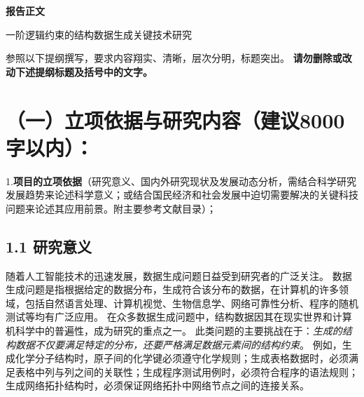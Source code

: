 \documentclass[12pt,UTF8,AutoFakeBold=3,a4paper]{ctexart} %
\begin{document}
\begin{center}
{\sanhao \kaishu \bfseries 报告正文 
\par 一阶逻辑约束的结构数据生成关键技术研究}
\end{center}

{\sihao \kaishu 参照以下提纲撰写，要求内容翔实、清晰，层次分明，标题突出。{\color{MsBlue} \bfseries 请勿删除或改动下述提纲标题及括号中的文字。}}
\vskip -5mm
{\color{MsBlue} \section{（一）立项依据与研究内容（建议8000字以内）：}}

{\sihao \kaishu \color{MsBlue} 1.{\bfseries 项目的立项依据}（研究意义、国内外研究现状及发展动态分析，需结合科学研究发展趋势来论述科学意义；或结合国民经济和社会发展中迫切需要解决的关键科技问题来论述其应用前景。附主要参考文献目录）；}


\subsection{1.1 研究意义}

随着人工智能技术的迅速发展，数据生成问题日益受到研究者的广泛关注。
数据生成问题是指根据给定的数据分布，生成符合该分布的数据，在计算机的许多领域，包括自然语言处理、计算机视觉、生物信息学、网络可靠性分析、程序的随机测试等均有广泛应用。
在众多数据生成问题中，结构数据因其在现实世界和计算机科学中的普遍性，成为研究的重点之一。
此类问题的主要挑战在于：\emph{生成的结构数据不仅要满足特定的分布，还要严格满足数据元素间的结构约束}。
例如，生成化学分子结构时，原子间的化学键必须遵守化学规则；生成表格数据时，必须满足表格中列与列之间的关联性；生成程序测试用例时，必须符合程序的语法规则；生成网络拓扑结构时，必须保证网络拓扑中网络节点之间的连接关系。
\end{document}

